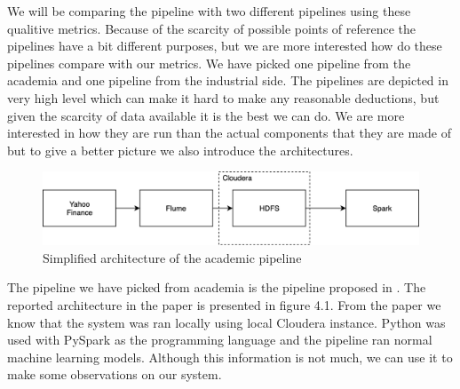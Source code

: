 

We will be comparing the pipeline with two different pipelines using these qualitive metrics.
Because of the scarcity of possible points of reference the pipelines have a bit different purposes, but we are more interested how do these pipelines compare with our metrics.
We have picked one pipeline from the academia and one pipeline from the industrial side.
The pipelines are depicted in very high level which can make it hard to make any reasonable deductions, but given the scarcity of data available it is the best we can do.
We are more interested in how they are run than the actual components that they are made of but to give a better picture we also introduce the architectures.

\begin{figure}[ht!]
    \includegraphics[scale=0.50]{images/example1} 
    \centering
    \caption{Simplified architecture of the academic pipeline}
\end{figure}

The pipeline we have picked from academia is the pipeline proposed in \cite{peng}.
The reported architecture in the paper is presented in figure 4.1.
From the paper we know that the system was ran locally using local Cloudera instance.
Python was used with PySpark as the programming language and the pipeline ran normal machine learning models.
Although this information is not much, we can use it to make some observations on our system.

